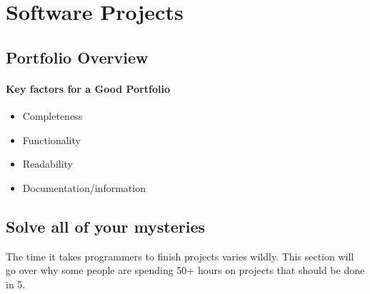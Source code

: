 \section{Software Projects}


\subsection{Portfolio Overview}

\paragraph*{Key factors for a Good Portfolio}
\begin{itemize}
\item Completeness
\item Functionality
\item Readability
\item Documentation/information
\end{itemize}

\subsection{Solve all of your mysteries}

The time it takes programmers to finish projects varies wildly. This section will go over why some people are spending 50+ hours on projects that should be done in 5.


